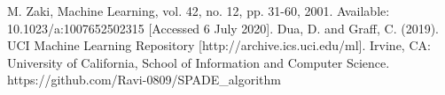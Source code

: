 \begin{thebibliography}{00}
     M. Zaki, Machine Learning, vol. 42, no. 12, pp. 31-60, 2001. Available: 10.1023/a:1007652502315 [Accessed 6 July 2020].
     Dua, D. and Graff, C. (2019). UCI Machine Learning Repository [http://archive.ics.uci.edu/ml]. Irvine, CA: University of California, School of Information and Computer Science.
     https://github.com/Ravi-0809/SPADE\_algorithm
\end{thebibliography}